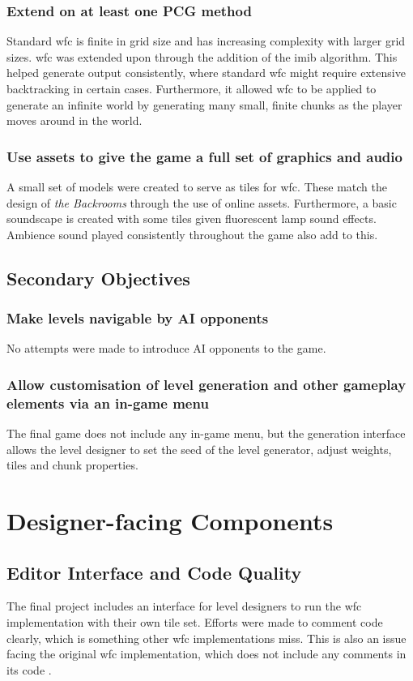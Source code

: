 \subsubsection{Extend on at least one PCG method}
Standard \acrlong{wfc} is finite in grid size and has increasing complexity with larger grid sizes. \acrshort{wfc} was extended upon through the addition of the \acrlong{imib} algorithm. This helped generate output consistently, where standard \acrshort{wfc} might require extensive backtracking in certain cases. Furthermore, it allowed \acrshort{wfc} to be applied to generate an infinite world by generating many small, finite chunks as the player moves around in the world.

\subsubsection{Use assets to give the game a full set of graphics and audio}
A small set of models were created to serve as tiles for \acrshort{wfc}. These match the design of \textit{the Backrooms} through the use of online assets. Furthermore, a basic soundscape is created with some tiles given fluorescent lamp sound effects. Ambience sound played consistently throughout the game also add to this.%

\subsection{Secondary Objectives}
\subsubsection{Make levels navigable by AI opponents}
No attempts were made to introduce AI opponents to the game.

\subsubsection{Allow customisation of level generation and other gameplay elements via an in-game menu}
The final game does not include any in-game menu, but the generation interface allows the level designer to set the seed of the level generator, adjust weights, tiles and chunk properties.

\section{Designer-facing Components}
\subsection{Editor Interface and Code Quality}
The final project includes an interface for level designers to run the \acrshort{wfc} implementation with their own tile set. Efforts were made to comment code clearly, which is something other \acrshort{wfc} implementations miss. This is also an issue facing the original \acrshort{wfc} implementation, which does not include any comments in its code \cite{Gumin_Wave_Function_Collapse_2016}.

